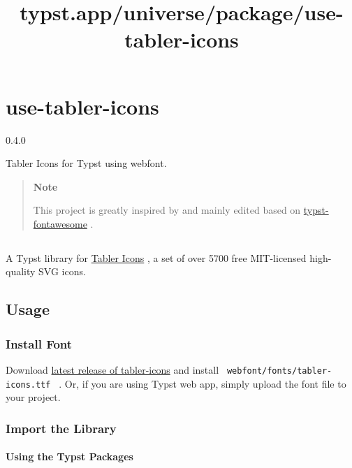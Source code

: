 \title{typst.app/universe/package/use-tabler-icons}

\label{banner}
\section{use-tabler-icons}\label{use-tabler-icons}

{ 0.4.0 }

Tabler Icons for Typst using webfont.

\label{readme}
\begin{quote}
\textbf{Note}

This project is greatly inspired by and mainly edited based on
\href{https://github.com/duskmoon314/typst-fontawesome}{typst-fontawesome}
.
\end{quote}

\subsection{\texorpdfstring{\protect\pandocbounded{}}{use-tabler-icons}}\label{use-tabler-icons-1}

A Typst library for \href{https://github.com/tabler/tabler-icons}{Tabler
Icons} , a set of over 5700 free MIT-licensed high-quality SVG icons.

\subsection{Usage}\label{usage}

\subsubsection{Install Font}\label{install-font}

Download \href{https://github.com/tabler/tabler-icons/releases}{latest
release of tabler-icons} and install
\texttt{\ webfont/fonts/tabler-icons.ttf\ } . Or, if you are using Typst
web app, simply upload the font file to your project.

\subsubsection{Import the Library}\label{import-the-library}

\paragraph{Using the Typst Packages}\label{using-the-typst-packages}

